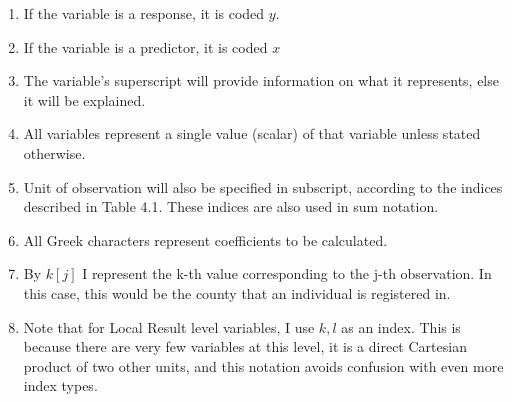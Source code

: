 \documentclass[12pt,twoside]{reedthesis}
\providecommand{\tightlist}{%
  \setlength{\itemsep}{0pt}\setlength{\parskip}{0pt}}
\begin{document}
  \begin{enumerate}
  \def\labelenumi{\arabic{enumi}.}
  \tightlist
  \item
    If the variable is a response, it is coded \(y\).
  \item
    If the variable is a predictor, it is coded \(x\)
  \item
    The variable's superscript will provide information on what it
    represents, else it will be explained.
  \item
    All variables represent a single value (scalar) of that variable
    unless stated otherwise.
  \item
    Unit of observation will also be specified in subscript, according to
    the indices described in Table 4.1. These indices are also used in sum
    notation.
  \item
    All Greek characters represent coefficients to be calculated.
  \item
    By \(k[j]\) I represent the k-th value corresponding to the j-th
    observation. In this case, this would be the county that an individual
    is registered in.
  \item
    Note that for Local Result level variables, I use \(k,l\) as an index.
    This is because there are very few variables at this level, it is a
    direct Cartesian product of two other units, and this notation avoids
    confusion with even more index types.
  \end{enumerate}
  
\end{document}
